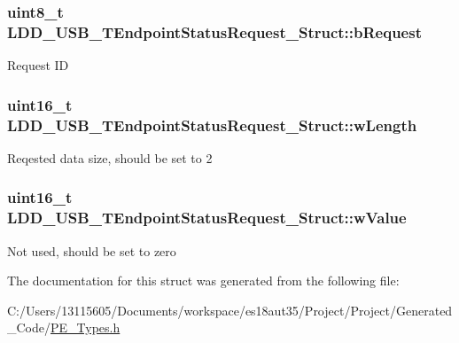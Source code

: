 \subsubsection[{b\+Request}]{\setlength{\rightskip}{0pt plus 5cm}uint8\+\_\+t L\+D\+D\+\_\+\+U\+S\+B\+\_\+\+T\+Endpoint\+Status\+Request\+\_\+\+Struct\+::b\+Request}\label{struct_l_d_d___u_s_b___t_endpoint_status_request___struct_ae8ab1e11dae5a0b3a4b4a7256a542175}
Request I\+D \hypertarget{struct_l_d_d___u_s_b___t_endpoint_status_request___struct_addba57e934f9c77c9159d7be618dd6dc}{}
\subsubsection[{w\+Length}]{\setlength{\rightskip}{0pt plus 5cm}uint16\+\_\+t L\+D\+D\+\_\+\+U\+S\+B\+\_\+\+T\+Endpoint\+Status\+Request\+\_\+\+Struct\+::w\+Length}\label{struct_l_d_d___u_s_b___t_endpoint_status_request___struct_addba57e934f9c77c9159d7be618dd6dc}
Reqested data size, should be set to 2 \hypertarget{struct_l_d_d___u_s_b___t_endpoint_status_request___struct_a987fe8c9322a22d8b5118eccd4de42c8}{}
\subsubsection[{w\+Value}]{\setlength{\rightskip}{0pt plus 5cm}uint16\+\_\+t L\+D\+D\+\_\+\+U\+S\+B\+\_\+\+T\+Endpoint\+Status\+Request\+\_\+\+Struct\+::w\+Value}\label{struct_l_d_d___u_s_b___t_endpoint_status_request___struct_a987fe8c9322a22d8b5118eccd4de42c8}
Not used, should be set to zero 

The documentation for this struct was generated from the following file\+:\begin{DoxyCompactItemize}
\item 
C\+:/\+Users/13115605/\+Documents/workspace/es18aut35/\+Project/\+Project/\+Generated\+\_\+\+Code/\hyperlink{_p_e___types_8h}{P\+E\+\_\+\+Types.\+h}\end{DoxyCompactItemize}
